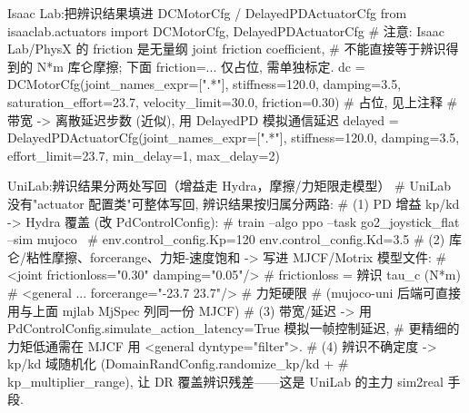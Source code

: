 
\begin{codebox}[Python]{Isaac Lab:把辨识结果填进 DCMotorCfg / DelayedPDActuatorCfg}
from isaaclab.actuators import DCMotorCfg, DelayedPDActuatorCfg
# 注意: Isaac Lab/PhysX 的 friction 是无量纲 joint friction coefficient,
# 不能直接等于辨识得到的 N*m 库仑摩擦; 下面 friction=... 仅占位, 需单独标定.
dc = DCMotorCfg(joint_names_expr=[".*"], stiffness=120.0, damping=3.5,
                saturation_effort=23.7, velocity_limit=30.0,
                friction=0.30)                          # 占位, 见上注释
# 带宽 -> 离散延迟步数 (近似), 用 DelayedPD 模拟通信延迟
delayed = DelayedPDActuatorCfg(joint_names_expr=[".*"],
                stiffness=120.0, damping=3.5, effort_limit=23.7,
                min_delay=1, max_delay=2)
\end{codebox}

\begin{codebox}[Python]{UniLab:辨识结果分两处写回（增益走 Hydra，摩擦/力矩限走模型）}
# UniLab 没有"actuator 配置类"可整体写回, 辨识结果按归属分两路:
# (1) PD 增益 kp/kd -> Hydra 覆盖 (改 PdControlConfig):
#   train --algo ppo --task go2_joystick_flat --sim mujoco \
#       env.control_config.Kp=120 env.control_config.Kd=3.5
# (2) 库仑/粘性摩擦、forcerange、力矩-速度饱和 -> 写进 MJCF/Motrix 模型文件:
#   <joint frictionloss="0.30" damping="0.05"/>      # frictionloss = 辨识 tau_c (N*m)
#   <general ... forcerange="-23.7 23.7"/>           # 力矩硬限
#   (mujoco-uni 后端可直接用与上面 mjlab MjSpec 列同一份 MJCF)
# (3) 带宽/延迟 -> 用 PdControlConfig.simulate_action_latency=True 模拟一帧控制延迟,
#     更精细的力矩低通需在 MJCF 用 <general dyntype="filter">.
# (4) 辨识不确定度 -> kp/kd 域随机化 (DomainRandConfig.randomize_kp/kd +
#     kp_multiplier_range), 让 DR 覆盖辨识残差——这是 UniLab 的主力 sim2real 手段.
\end{codebox}

